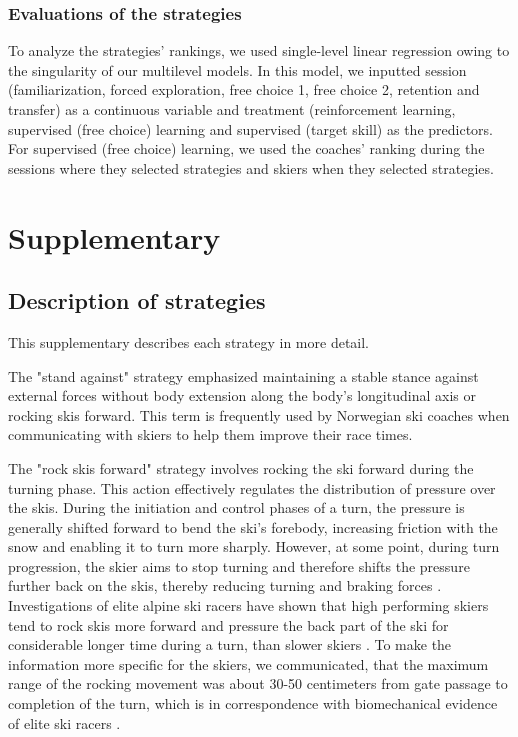 \documentclass{article}
\begin{document}
\subsubsection{Evaluations of the strategies}
To analyze the strategies' rankings, we used single-level linear regression owing to the singularity of our multilevel models. In this model, we inputted session (familiarization, forced exploration, free choice 1, free choice 2, retention and transfer) as a continuous variable and treatment (reinforcement learning, supervised (free choice) learning and supervised (target skill) as the predictors. For supervised (free choice) learning, we used the coaches' ranking during the sessions where they selected strategies and skiers when they selected strategies.


\section{Supplementary}


\subsection{Description of strategies}\label{sup_strategies}
This supplementary describes each strategy in more detail. 

The "stand against" strategy emphasized maintaining a stable stance against external forces without body extension along the body's longitudinal axis or rocking skis forward. This term is frequently used by Norwegian ski coaches when communicating with skiers to help them improve their race times. 

The "rock skis forward" strategy involves rocking the ski forward during the turning phase. This action effectively regulates the distribution of pressure over the skis. During the initiation and control phases of a turn, the pressure is generally shifted forward to bend the ski's forebody, increasing friction with the snow and enabling it to turn more sharply. However, at some point, during turn progression, the skier aims to stop turning and therefore shifts the pressure further back on the skis, thereby reducing turning and braking forces \cite{lemaster_skiers_1999, lemaster_ultimate_2010}. Investigations of elite alpine ski racers have shown that high performing skiers tend to rock skis more forward and pressure the back part of the ski for considerable longer time during a turn, than slower skiers \cite{reid_kinematic_2010, tjorhom_beskrivelse_2007, reid_alpine_2020}. To make the information more specific for the skiers, we communicated, that the maximum range of the rocking movement was about 30-50 centimeters from gate passage to completion of the turn, which is in correspondence with biomechanical evidence of elite ski racers \cite{reid_kinematic_2010}. 
\end{document}

